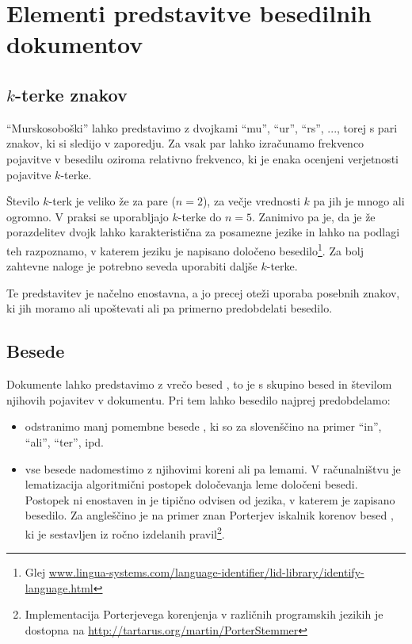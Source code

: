 \section{Elementi predstavitve besedilnih dokumentov}

\subsection{$k$-terke znakov}

``Murskosoboški'' lahko predstavimo z dvojkami ``mu'', ``ur'', ``rs'',
..., torej s pari znakov, ki si sledijo v zaporedju. Za vsak par lahko
izračunamo frekvenco pojavitve v besedilu oziroma relativno frekvenco,
ki je enaka ocenjeni verjetnosti pojavitve $k$-terke. 

Število $k$-terk je veliko že za pare ($n=2$), za večje vrednosti $k$
pa jih je mnogo ali ogromno. V praksi se uporabljajo $k$-terke do
$n=5$. Zanimivo pa je, da je že porazdelitev dvojk lahko
karakteristična za posamezne jezike in lahko na podlagi teh
razpoznamo, v katerem jeziku je napisano določeno
besedilo\footnote{Glej
  \url{www.lingua-systems.com/language-identifier/lid-library/identify-language.html}}. Za
bolj zahtevne naloge je potrebno seveda uporabiti daljše $k$-terke.

Te predstavitev je načelno enostavna, a jo precej oteži uporaba
posebnih znakov, ki jih moramo ali upoštevati ali pa primerno
predobdelati besedilo.

\subsection{Besede}

Dokumente lahko predstavimo z vrečo besed , to je s
skupino besed in številom njihovih pojavitev v dokumentu. Pri tem
lahko besedilo najprej predobdelamo:
\begin{itemize}
\item odstranimo manj pomembne besede , ki so za
  slovenščino na primer ``in'', ``ali'', ``ter'', ipd.
\item vse besede nadomestimo z njihovimi koreni ali pa lemami. V
  računalništvu je lematizacija algoritmični postopek določevanja leme
  določeni besedi. Postopek ni enostaven in je tipično odvisen od
  jezika, v katerem je zapisano besedilo. Za angleščino je na primer
  znan Porterjev iskalnik korenov besed , ki je
  sestavljen iz ročno izdelanih pravil\footnote{Implementacija
    Porterjevega korenjenja v različnih programskih jezikih je
    dostopna na \url{http://tartarus.org/martin/PorterStemmer}}.
\end{itemize}

